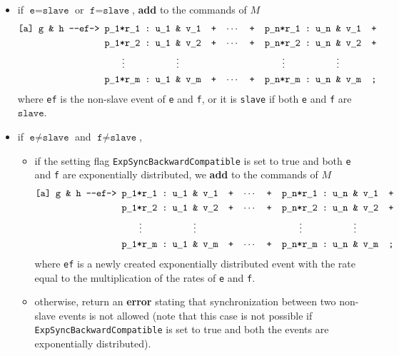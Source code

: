 \documentclass{article}
\newcommand{\arci}[1]{{-}{-}{#1}->}
\renewcommand{\_}{\underline{~}}
\newcommand{\code}[1]{\texttt{#1}}
\begin{document}
\begin{enumerate}
\begin{itemize}
		\item if $\code{e} = \code{slave}$ or  $\code{f} = \code{slave}$, \textbf{add} to the commands of $M$ 
		\begin{align*}
			\code{[a] g \&  h \arci{ef}} 
			  & \code{ p\_1*r\_1\ :\ u\_1 \& v\_1 ~+~ $\cdots$ ~+~ p\_n*r\_1\ :\ u\_n \& v\_1 ~+}\\
			  & \code{ p\_1*r\_2\ :\ u\_1 \& v\_2 ~+~ $\cdots$ ~+~ p\_n*r\_2\ :\ u\_n \& v\_2 ~+}\\
              & ~~~~~~~ \vdots ~~~~~~~~~~~~~~~~ \vdots ~~~~~~~~~~~~~~~~~~~~~~~~~~~~~~~~ \vdots ~~~~~~~~~~~~~~~~ \vdots \\
			  & \code{ p\_1*r\_m\ :\ u\_1 \& v\_m ~+~ $\cdots$ ~+~ p\_n*r\_m\ :\ u\_n \& v\_m ~;}\\
		\end{align*}
		where \code{ef} is the non-slave event of \code{e} and \code{f}, or it is \code{slave} if both \code{e} and \code{f} are $\code{slave}$.
		\item if $\code{e} \neq \code{slave}$ and $\code{f} \neq \code{slave}$, 
		\begin{itemize}
			\item if the setting flag \code{ExpSyncBackwardCompatible} is set to true and both \code{e} and \code{f} are exponentially distributed, we \textbf{add} to the commands of $M$ 
			\begin{align*}
			   \code{[a] g \&  h \arci{ef}} 
			     & \code{ p\_1*r\_1\ :\ u\_1 \& v\_1 ~+~ $\cdots$ ~+~ p\_n*r\_1\ :\ u\_n \& v\_1 ~+}\\
			     & \code{ p\_1*r\_2\ :\ u\_1 \& v\_2 ~+~ $\cdots$ ~+~ p\_n*r\_2\ :\ u\_n \& v\_2 ~+}\\
			     & ~~~~~~~ \vdots ~~~~~~~~~~~~~~~~ \vdots ~~~~~~~~~~~~~~~~~~~~~~~~~~~~~~~~ \vdots ~~~~~~~~~~~~~~~~ \vdots \\
			     & \code{ p\_1*r\_m\ :\ u\_1 \& v\_m ~+~ $\cdots$ ~+~ p\_n*r\_m\ :\ u\_n \& v\_m ~;}\\
			\end{align*}
			where \code{ef} is a newly created exponentially distributed event with the rate equal to the multiplication of the rates of \code{e} and \code{f}.
			
			
			\item otherwise, return an \textbf{error} stating that synchronization between two non-slave events is not allowed 
			(note that this case is not possible if \code{ExpSyncBackwardCompatible} is set to true and both the events are exponentially distributed).
		\end{itemize} 
	\end{itemize}
\end{enumerate}
\end{document}

